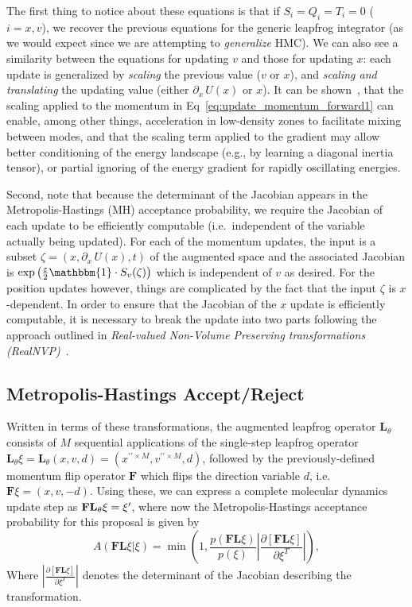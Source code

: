 The first thing to notice about these equations is that if $S_{i} = Q_{i} =
T_{i} = 0$ ($i = x, v$), we recover the previous equations for the generic
leapfrog integrator (as we would expect since we are attempting to
\emph{generalize} HMC).
%
We can also see a similarity between the equations for updating $v$ and those
for updating $x$: each update is generalized by \emph{scaling} the previous
value ($v$ or $x$), and \emph{scaling and translating} the updating value
(either $\partial_{x}\,U(x)$ or $x$).
%
It can be shown~\cite{2017arXiv171109268L}, that the scaling applied to the
momentum in Eq~\ref{eq:update_momentum_forward1} can enable, among other
things, acceleration in low-density zones to facilitate mixing between modes,
and that the scaling term applied to the gradient may allow better conditioning
of the energy landscape (e.g., by learning a diagonal inertia tensor), or
partial ignoring of the energy gradient for rapidly oscillating energies.

Second, note that because the determinant of the Jacobian appears in the
Metropolis-Hastings (MH) acceptance probability, we require the Jacobian of
each update to be efficiently computable (i.e.\ independent of the variable
actually being updated).
%
For each of the momentum updates, the input is a subset $\zeta = (x,
\partial_{x}\,U(x), t)$ of the augmented space and the associated Jacobian is
$\exp{\left(\frac{\eps}{2}\mathbbm{1}\cdot S_{v}(\zeta)\right)}$ which is
independent of $v$ as desired.
%
For the position updates however, things are complicated by the fact that the
input $\zeta$ is $x$-dependent.
%
In order to ensure that the Jacobian of the $x$ update is efficiently
computable, it is necessary to break the update into two parts following the
approach outlined in \emph{Real-valued Non-Volume Preserving transformations
(RealNVP)}~\cite{dinhRealNVP}.
%
\subsection{Metropolis-Hastings Accept/Reject}
Written in terms of these transformations, the augmented leapfrog operator
$\mathbf{L}_{\theta}$ consists of $M$ sequential applications of the
single-step leapfrog operator $\mathbf{L}_{\theta} \xi = \mathbf{L}_{\theta}(x,
v, d) = (x^{\prime\prime\times M}, v^{\prime\prime\times M}, d)$, followed by
the previously-defined momentum flip operator $\mathbf{F}$ which flips the
direction variable $d$, i.e.\ $\mathbf{F}\xi = (x, v, -d)$.
%
Using these, we can express a complete molecular dynamics update step as
$\mathbf{FL}_{\theta}\xi = {\xi^{\prime}}$, where now the Metropolis-Hastings acceptance
probability for this proposal is given by
%
\begin{equation}
    A(\mathbf{F}\mathbf{L} \xi | \xi) = \min\left(1,
        \frac{p(\mathbf{F}\mathbf{L}\xi)}{p(\xi)}\left|
        \frac{\partial\left[\mathbf{F}\mathbf{L}\xi\right]}
            {\partial\xi^{T}}\right|\right),
\end{equation}
%
Where $\left|\frac{\partial\left[\mathbf{F}\mathbf{L}\xi\right]}
{\partial\xi^{T}}\right|$ denotes the determinant of the Jacobian describing
the transformation.

